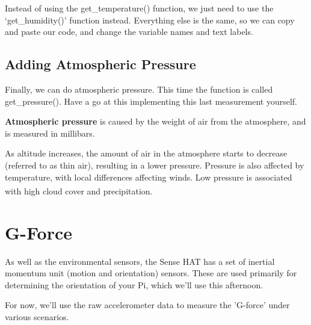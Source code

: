 \documentclass[a4paper, twocolumn, twoside, 12pt]{article}
\newenvironment{aside}
		{
		\begin{mdframed}[
			style=0,%
			leftline=false,
			rightline=false,
			innerbottommargin=2pt,
			innerleftmargin=12pt,
			innerrightmargin=0pt,
			linewidth=0.75pt,
			skipabove=6pt,
			skipbelow=6pt
			]
				\small
				\color{JungleGreen}
				\setlength{\parskip}{2pt}
				\vspace{2pt} %
		}
		{
		\end{mdframed}
		}
\begin{document}
		Instead of using the get\_temperature() function, we just need to use the `get\_humidity()' function instead. Everything else is the same, so we can copy and paste our code, and change the variable names and text labels.
		
		

		\subsection*{Adding Atmospheric Pressure}		
		Finally, we can do atmospheric pressure. This time the function is called get\_pressure(). Have a go at this implementing this last measurement yourself.
		\begin{aside}
			\textbf{Atmospheric pressure} is caused by the weight of air from the atmosphere, and is measured in millibars.
			
			As altitude increases, the amount of air in the atmosphere starts to decrease (referred to as thin air), resulting in a lower pressure. Pressure is also affected by temperature, with local differences affecting winds. Low pressure is associated with high cloud cover and precipitation.
			\textsuperscript{\cite{pressure}}
		\end{aside}
		
	\section{G-Force}
	
		As well as the environmental sensors, the Sense HAT has a set of inertial momentum unit (motion and orientation) sensors. These are used primarily for determining the orientation of your Pi, which we'll use this afternoon.
		
		For now, we'll use the raw accelerometer data to measure the 'G-force' under various scenarios.
		
\end{document}
